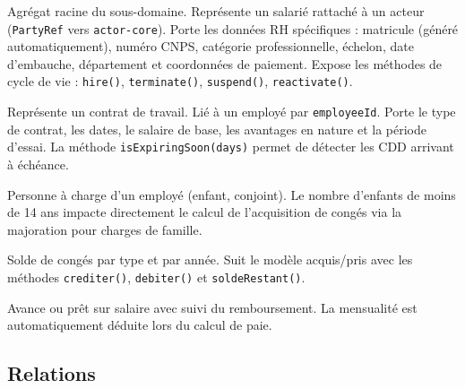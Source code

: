 \documentclass[a4paper,12pt,openany]{book}
\begin{document}
    \begin{description}[style=nextline]
  \item[\texttt{Employee}] Agrégat racine du sous-domaine. Représente un salarié rattaché à un acteur (\texttt{PartyRef} vers \texttt{actor-core}). Porte les données RH spécifiques : matricule (généré automatiquement), numéro CNPS, catégorie professionnelle, échelon, date d'embauche, département et coordonnées de paiement. Expose les méthodes de cycle de vie : \texttt{hire()}, \texttt{terminate()}, \texttt{suspend()}, \texttt{reactivate()}.

  \item[\texttt{Contract}] Représente un contrat de travail. Lié à un employé par \texttt{employeeId}. Porte le type de contrat, les dates, le salaire de base, les avantages en nature et la période d'essai. La méthode \texttt{isExpiringSoon(days)} permet de détecter les CDD arrivant à échéance.

  \item[\texttt{Dependent}] Personne à charge d'un employé (enfant, conjoint). Le nombre d'enfants de moins de 14 ans impacte directement le calcul de l'acquisition de congés via la majoration pour charges de famille.

  \item[\texttt{LeaveBalance}] Solde de congés par type et par année. Suit le modèle acquis/pris avec les méthodes \texttt{crediter()}, \texttt{debiter()} et \texttt{soldeRestant()}.

  \item[\texttt{LoanAdvance}] Avance ou prêt sur salaire avec suivi du remboursement. La mensualité est automatiquement déduite lors du calcul de paie.
    \end{description}

    \subsection{Relations}
\end{document}
